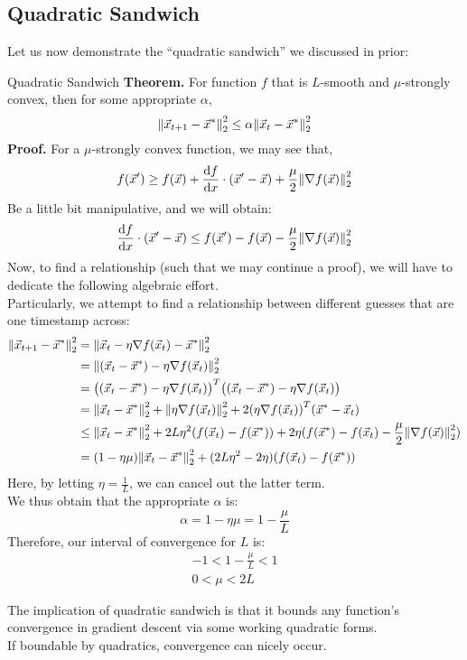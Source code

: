 \subsection{Quadratic Sandwich}
Let us now demonstrate the ``quadratic sandwich'' we discussed in prior:
\begin{ln-theorem}{Quadratic Sandwich}{}
    \textbf{Theorem.} For function $f$ that is $L$-smooth and $\mu$-strongly convex, then for some appropriate $\alpha$,
    \[
        \pnorm[2]{\vec{x}_{t + 1} - \vec{x}^*}{2} \leq \alpha \pnorm[2]{\vec{x}_t - \vec{x}^*}{2}
    \]
    \tcblower
    \textbf{Proof.} For a $\mu$-strongly convex function, we may see that,
    \[
        f(\vec{x}') \geq f(\vec{x}) + \dv{f}{x} \cdot (\vec{x}' - \vec{x}) + \frac{\mu}{2} \pnorm[2]{\nabla f(\vec{x})}{2}
    \]
    Be a little bit manipulative, and we will obtain:
    \[
        \dv{f}{x} \cdot (\vec{x}' - \vec{x}) \leq f(\vec{x}') - f(\vec{x}) - \frac{\mu}{2} \pnorm[2]{\nabla f(\vec{x})}{2}
    \]
    Now, to find a relationship (such that we may continue a proof), we will have to dedicate the following algebraic effort.\\
    Particularly, we attempt to find a relationship between different guesses that are one timestamp across:
    \begin{align*}
        \pnorm[2]{\vec{x}_{t + 1} - \vec{x}^*}{2}
        &= \pnorm[2]{\vec{x}_t - \eta \nabla f(\vec{x}_t) - \vec{x}^*}{2} \\
        &= \pnorm[2]{(\vec{x}_t - \vec{x}^*) - \eta \nabla f(\vec{x}_t)}{2} \\
        &= {\big( (\vec{x}_t - \vec{x}^*) - \eta \nabla f(\vec{x}_t) \big)}^T \big( (\vec{x}_t - \vec{x}^*) - \eta \nabla f(\vec{x}_t) \big) \\
        &= \pnorm[2]{\vec{x}_t - \vec{x}^*}{2} + \pnorm[2]{\eta \nabla f(\vec{x}_t)}{2} + 2 {(\eta \nabla f(\vec{x}_t))}^T {(\vec{x}^* - \vec{x}_t)} \\
        &\leq \pnorm[2]{\vec{x}_t - \vec{x}^*}{2} + 2L \eta^2 (f(\vec{x}_t) - f(\vec{x}^*)) + 2 \eta (f(\vec{x}^*) - f(\vec{x}_t) - \frac{\mu}{2} \pnorm[2]{\nabla f(\vec{x})}{2}) \\
        &= (1 - \eta \mu) \pnorm[2]{\vec{x}_t - \vec{x}^*}{2} + (2L \eta^2 - 2\eta) (f(\vec{x}_t) - f(\vec{x}^*))
    \end{align*}
    Here, by letting $\eta = \frac{1}{L}$, we can cancel out the latter term. \\
    We thus obtain that the appropriate $\alpha$ is:
    \[
        \alpha = 1 - \eta \mu = 1 - \frac{\mu}{L}
    \]
    Therefore, our interval of convergence for $L$ is:
    \begin{align*}
        -1 < 1 - \frac{\mu}{L} < 1 \\
        0 < \mu < 2L
    \end{align*}
\end{ln-theorem}
The implication of quadratic sandwich is that it bounds any function's convergence in gradient descent via some working quadratic forms. \\
If boundable by quadratics, convergence can nicely occur.

